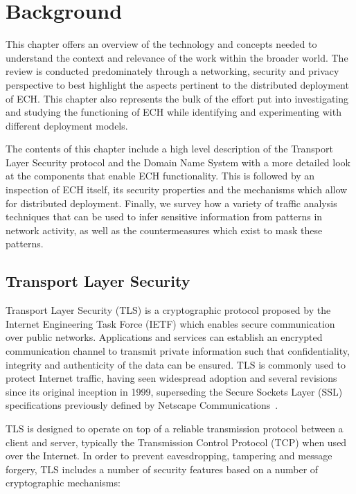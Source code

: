 \chapter{Background}\label{Background}

This chapter offers an overview of the technology and concepts needed to understand the context and relevance of the work within the broader world. The review is conducted predominately through a networking, security and privacy perspective to best highlight the aspects pertinent to the distributed deployment of ECH. This chapter also represents the bulk of the effort put into investigating and studying the functioning of ECH while identifying and experimenting with different deployment models.

The contents of this chapter include a high level description of the Transport Layer Security protocol and the Domain Name System with a more detailed look at the components that enable ECH functionality. This is followed by an inspection of ECH itself, its security properties and the mechanisms which allow for distributed deployment. Finally, we survey how a variety of traffic analysis techniques that can be used to infer sensitive information from patterns in network activity, as well as the countermeasures which exist to mask these patterns.








\section{Transport Layer Security}

Transport Layer Security (TLS) is a cryptographic protocol proposed by the Internet Engineering Task Force (IETF) which enables secure communication over public networks. Applications and services can establish an encrypted communication channel to transmit private information such that confidentiality, integrity and authenticity of the data can be ensured. TLS is commonly used to protect Internet traffic, having seen widespread adoption and several revisions since its original inception in 1999, superseding the Secure Sockets Layer (SSL) specifications previously defined by Netscape Communications~\cite{chan2018monitoring, LE-HTTPS, rfc2246}.

TLS is designed to operate on top of a reliable transmission protocol between a client and server, typically the Transmission Control Protocol (TCP) when used over the Internet. In order to prevent eavesdropping, tampering and message forgery, TLS includes a number of security features based on a number of cryptographic mechanisms:

